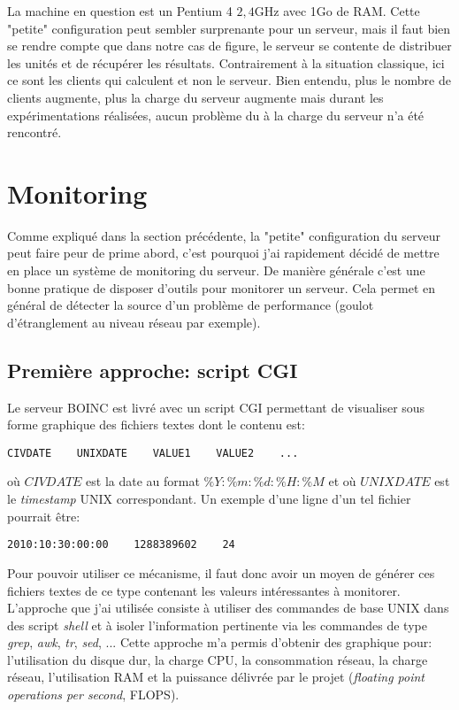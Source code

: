 \documentclass[a4paper, 11pt]{report}
\begin{document}
La machine en question est un Pentium 4 \@ $2,4$GHz avec 1Go de RAM. Cette "petite" configuration peut sembler surprenante pour un serveur, mais il faut bien se rendre compte que dans notre cas de figure, le serveur se contente de distribuer les unités et de récupérer les résultats. Contrairement à la situation classique, ici ce sont les clients qui calculent et non le serveur. Bien entendu, plus le nombre de clients augmente, plus la charge du serveur augmente mais durant les expérimentations réalisées, aucun problème du à la charge du serveur n'a été rencontré.

\section{Monitoring}
Comme expliqué dans la section précédente, la "petite" configuration du serveur peut faire peur de prime abord, c'est pourquoi j'ai rapidement décidé de mettre en place un système de monitoring du serveur. De manière générale c'est une bonne pratique de disposer d'outils pour monitorer un serveur. Cela permet en général de détecter la source d'un problème de performance (goulot d'étranglement au niveau réseau par exemple).

\subsection{Première approche: script CGI}
Le serveur \textsc{BOINC} est livré avec un script CGI permettant de visualiser sous forme graphique des fichiers textes dont le contenu est:
\begin{verbatim}
CIVDATE    UNIXDATE    VALUE1    VALUE2    ...
\end{verbatim}
où $CIVDATE$ est la date au format $\%Y:\%m:\%d:\%H:\%M$ et où $UNIXDATE$ est le \textit{timestamp} UNIX correspondant. Un exemple d'une ligne d'un tel fichier pourrait être:
\begin{verbatim}
2010:10:30:00:00    1288389602    24
\end{verbatim}

Pour pouvoir utiliser ce mécanisme, il faut donc avoir un moyen de générer ces fichiers textes de ce type contenant les valeurs intéressantes à monitorer. L'approche que j'ai utilisée consiste à utiliser des commandes de base UNIX dans des script \textit{shell} et à isoler l'information pertinente via les commandes de type \textit{grep}, \textit{awk}, \textit{tr}, \textit{sed}, ... Cette approche m'a permis d'obtenir des graphique pour: l'utilisation du disque dur, la charge CPU, la consommation réseau, la charge réseau, l'utilisation RAM et la puissance délivrée par le projet (\textit{floating point operations per second}, FLOPS).
\end{document}
